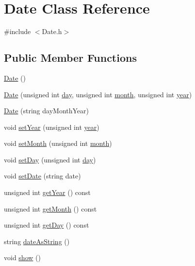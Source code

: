 \hypertarget{classDate}{}\section{Date Class Reference}
\label{classDate}


{\ttfamily \#include $<$Date.\+h$>$}

\subsection*{Public Member Functions}
\begin{DoxyCompactItemize}
\item 
\hyperlink{classDate_a4e59ed4ba66eec61c27460c5d09fa1bd}{Date} ()
\item 
\hyperlink{classDate_a28c6604a0f8ed8216becf24abc20cf5b}{Date} (unsigned int \hyperlink{classDate_a6c498dee79268960e000ec3deaa555ac}{day}, unsigned int \hyperlink{classDate_af48402007169fe01234fe9bb9e7a1d2c}{month}, unsigned int \hyperlink{classDate_afc014a1ae62e56be473144050201e62a}{year})
\item 
\hyperlink{classDate_a2ca1c1b9d156db59120f5a3727df134c}{Date} (string day\+Month\+Year)
\item 
void \hyperlink{classDate_a1299c7e1f0080304f082a9225a743957}{set\+Year} (unsigned int \hyperlink{classDate_afc014a1ae62e56be473144050201e62a}{year})
\item 
void \hyperlink{classDate_aa83b79359070012ab58ff99abeb34340}{set\+Month} (unsigned int \hyperlink{classDate_af48402007169fe01234fe9bb9e7a1d2c}{month})
\item 
void \hyperlink{classDate_a18dc2bd52ab8adcca331f66c27ed6623}{set\+Day} (unsigned int \hyperlink{classDate_a6c498dee79268960e000ec3deaa555ac}{day})
\item 
void \hyperlink{classDate_abbd3c22e63d9fb3fbb1a34e5614aab22}{set\+Date} (string date)
\item 
unsigned int \hyperlink{classDate_a597b505c264a24d34369c43119fc4e6e}{get\+Year} () const
\item 
unsigned int \hyperlink{classDate_a6152596dcf2e1e78e2095ea518de59e7}{get\+Month} () const
\item 
unsigned int \hyperlink{classDate_a13855b25efb79eaf7dccf08555421a1d}{get\+Day} () const
\item 
string \hyperlink{classDate_a00fe723e95db62fed0990f5b28f8baf2}{date\+As\+String} ()
\item 
void \hyperlink{classDate_addaed921af229dffeb35ef7ef30bff29}{show} ()

\end{DoxyCompactItemize}
